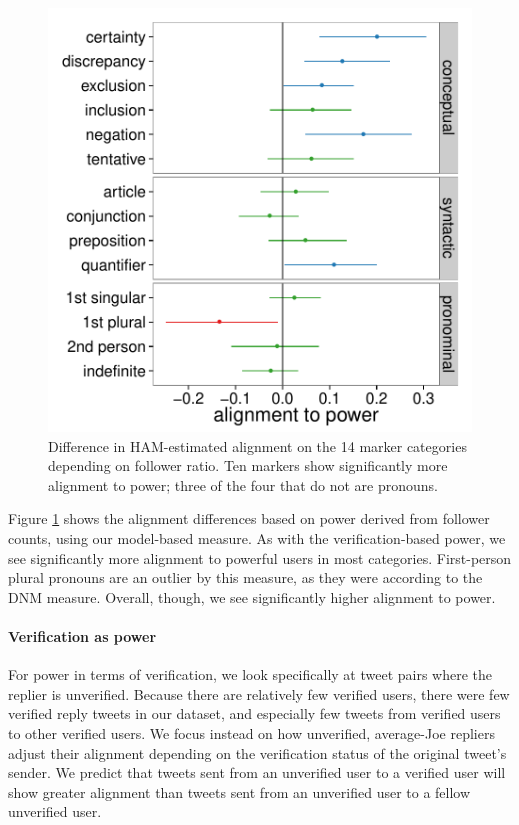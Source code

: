 \documentclass{acm_proc_article-sp}
\begin{document}
\begin{figure}[t]
\centering
\includegraphics[width=.9\columnwidth]{graphics/www2016_ourpowerdiff_fratio_final95.pdf}
\caption{Difference in HAM-estimated alignment on the 14 marker categories depending on follower ratio. Ten markers show significantly more alignment to power; three of the four that do not are pronouns.}\label{fig:our-fratio}
\end{figure}

Figure \ref{fig:our-fratio} shows the alignment differences based on power derived from follower counts, using our model-based measure.  As with the verification-based power, we see significantly more alignment to powerful users in most categories. First-person plural pronouns are an outlier by this measure, as they were according to the DNM measure.  Overall, though, we see significantly higher alignment to power.


\paragraph{Verification as power} For power in terms of verification, we look specifically at tweet pairs where the replier is unverified.  Because there are relatively few verified users, there were few verified reply tweets in our dataset, and especially few tweets from verified users to other verified users. We focus instead on how unverified, average-Joe repliers adjust their alignment depending on the verification status of the original tweet's sender.  We predict that tweets sent from an unverified user to a verified user will show greater alignment than tweets sent from an unverified user to a fellow unverified user.  
\end{document}
